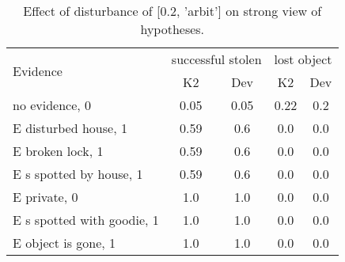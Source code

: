 \begin{table}\begin{tabular}{l|cc|cc}\toprule\multirow{2}{*}{Evidence} & \multicolumn{2}{c}{successful stolen}& \multicolumn{2}{c}{lost object}\\& {K2} & {Dev}& {K2} & {Dev}\\\midrule
no evidence, 0 & 0.05&0.05&0.22&0.2\\E disturbed house, 1 & 0.59&0.6&0.0&0.0\\E broken lock, 1 & 0.59&0.6&0.0&0.0\\E s spotted by house, 1 & 0.59&0.6&0.0&0.0\\E private, 0 & 1.0&1.0&0.0&0.0\\E s spotted with goodie, 1 & 1.0&1.0&0.0&0.0\\E object is gone, 1 & 1.0&1.0&0.0&0.0\\\bottomrule\end{tabular}\caption{Effect of disturbance of [0.2, 'arbit'] on strong view of hypotheses.}\end{table}